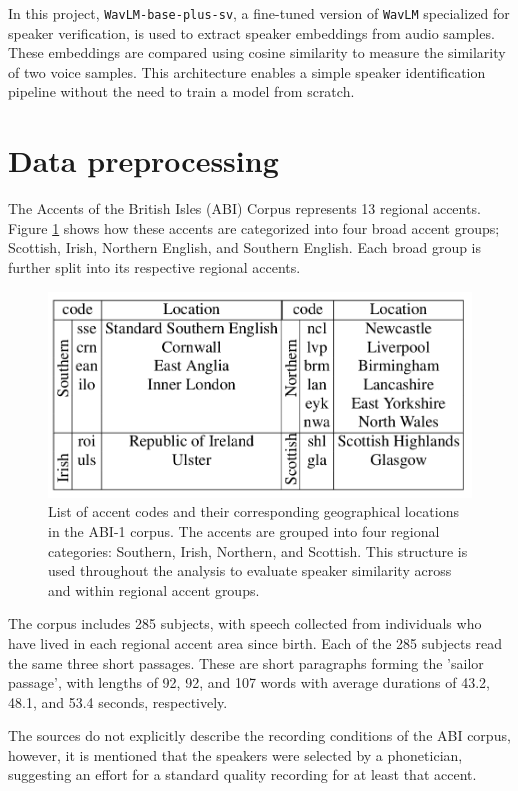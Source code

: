 \documentclass[conference]{IEEEtran}
\begin{document}
In this project, \texttt{WavLM-base-plus-sv}, a fine-tuned version of \texttt{WavLM} specialized for speaker verification, is used to extract speaker embeddings from audio samples. These embeddings are compared using cosine similarity to measure the similarity of two voice samples. This architecture enables a simple speaker identification pipeline without the need to train a model from scratch.


\section{Data preprocessing}
\label{sec:data-processing}

The Accents of the British Isles (ABI) Corpus represents 13 regional accents. Figure \ref{fig:img-abi-corpus-accents} shows how these accents are categorized into four broad accent groups; Scottish, Irish, Northern English, and Southern English. Each broad group is further split into its respective regional accents\cite{najafian2016improving}.

\begin{figure}[H]
	\centering
	\includegraphics[width=0.7\linewidth]{img/img-abi-corpus-accents}
	\caption{List of accent codes and their corresponding geographical locations in the ABI-1 corpus\cite{najafian2016improving}. The accents are grouped into four regional categories: Southern, Irish, Northern, and Scottish. This structure is used throughout the analysis to evaluate speaker similarity across and within regional accent groups.}
	\label{fig:img-abi-corpus-accents}
\end{figure}

The corpus includes 285 subjects, with speech collected from individuals who have lived in each regional accent area since birth. Each of the 285 subjects read the same three short passages. These are short paragraphs forming the 'sailor passage', with lengths of 92, 92, and 107 words with average durations of 43.2, 48.1, and 53.4 seconds, respectively\cite{najafian2016improving}.

The sources do not explicitly describe the recording conditions of the ABI corpus, however, it is mentioned that the speakers were selected by a phonetician, suggesting an effort for a standard quality recording for at least that accent\cite{najafian2016improving}.
\end{document}
